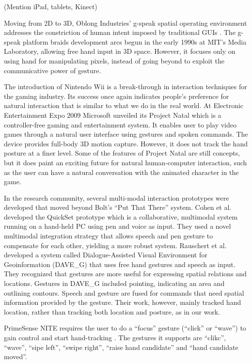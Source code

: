 (Mention iPad, tablets, Kinect)

Moving from 2D to 3D, Oblong Industries' g-speak spatial operating environment addresses the constriction of human intent imposed by traditional GUIs \cite{Oblong09}. The g-speak platform braids development arcs begun in the early 1990s at MIT's Media Laboratory, allowing free hand input in 3D space. However, it focuses only on using hand for manipulating pixels, instead of going beyond to exploit the communicative power of gesture. 

The introduction of Nintendo Wii is a break-through in interaction techniques for the gaming industry. Its success once again indicates people's preference for natural interaction that is similar to what we do in the real world. At Electronic Entertainment Expo 2009 Microsoft unveiled its Project Natal which is a controller-free gaming and entertainment system. It enables user to play video games through a natural user interface using gestures and spoken commands. The device provides full-body 3D motion capture. However, it does not track the hand posture at a finer level. Some of the features of Project Natal are still concepts, but it does paint an exciting future for natural human-computer interaction, such as the user can have a natural conversation with the animated character in the game.

In the research community, several multi-modal interaction prototypes were developed that moved beyond Bolt's ``Put That There'' system. Cohen et al. \cite{Cohen97} developed the QuickSet prototype which is a collaborative, multimodal system running on a hand-held PC using pen and voice as input. They used a novel multimodal integration strategy that allows speech and pen gesture to compensate for each other, yielding a more robust system. Rauschert et al. \cite{Rauschert02} developed a system called Dialogue-Assisted Visual Environment for Geoinformation (DAVE\_G) that uses free hand gestures and speech as input. They recognized that gestures are more useful for expressing spatial relations and locations. Gestures in DAVE\_G included pointing, indicating an area and outlining contours. Speech and gesture are fused for commands that need spatial information provided by the gesture. Their work, however, mainly tracked hand location, rather than tracking both location and posture, as in our work.

PrimeSense NITE requires the user to do a ``focus'' gesture (``click'' or
``wave'') to gain control and start hand-tracking \cite{Primesense}. The
gestures it supports are ``clikc'', ``wave'', ``sipe left'', ``swipe right'', ``raise
hand candidate'' and ``hand candidate moved''.

